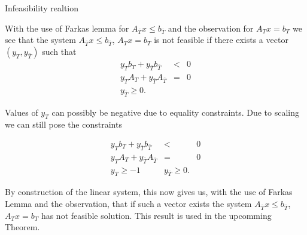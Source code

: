 \documentclass{beamer}
\begin{document}

\begin{frame}

	\begin{block}{Infeasibility realtion}

		With the use of Farkas lemma for $A_{\bar{T}} x \leq b_{\bar{T}}$ and the observation for $A_T x = b_T$ we see that the system $A_{\bar{T}} x \leq b_{\bar{T}}$, $A_T x = b_T$ is not feasible if there exists a vector $(y_T, y_{\bar{T}})$ such that\\

		\begin{eqnarray}\label{eq:3}
			y_T b_T + y_{\bar{T}} b_{\bar{T}} & < & 0 \nonumber\\
			y_T A_T + y_{\bar{T}} A_{\bar{T}} & = & 0 \nonumber\\
			y_{\bar{T}} \geq 0.
		\end{eqnarray}

	\end{block}

\end{frame}

\begin{frame}

	\begin{block}

		Values of $y_T$ can possibly be negative due to equality constraints. Due to scaling we can still pose the constraints

		\begin{eqnarray} \label{eq:4}
			y_T b_T + y_{\bar{T}} b_{\bar{T}} & < & 0 \nonumber\\
			y_T A_T + y_{\bar{T}} A_{\bar{T}} & = & 0 \nonumber\\
			y_T \geq -1 & y_{\bar{T}} \geq 0.
		\end{eqnarray}

		By construction of the linear system, this now gives us, with the use of Farkas Lemma and the observation, that if such a vector exists the system $A_{\bar{T}} x \leq b_{\bar{T}}$, $A_T x = b_T$ has not feasible solution. This result is used in the upcomming Theorem.

	\end{block}

\end{frame}

\end{document}
